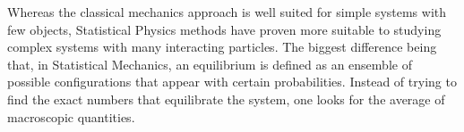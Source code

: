 Whereas the classical mechanics approach is well suited for simple systems with few objects, Statistical Physics methods have proven more suitable to studying complex systems with many interacting particles. The biggest difference being that, in Statistical Mechanics, an equilibrium is defined as an ensemble of possible configurations that appear with certain probabilities. Instead of trying to find the exact numbers that equilibrate the system, one looks for the average of macroscopic quantities.


 \cite{savage} \cite{mascolell}

\cite{Tversky74, Kahneman79, Tversky81}



